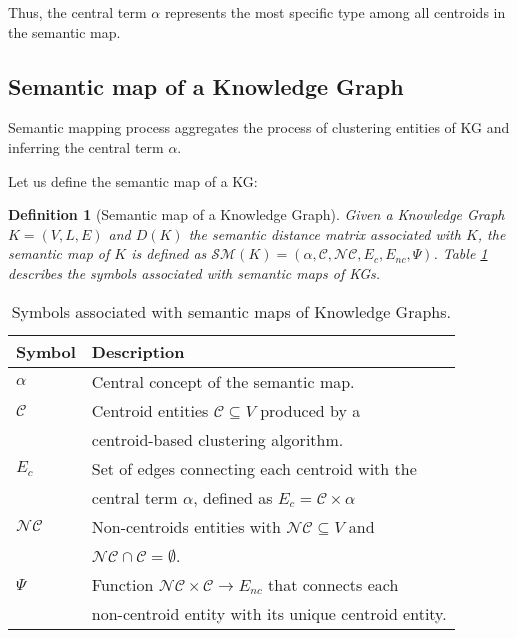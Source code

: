 \documentclass{ieeeaccess}
\newtheorem{Definition}{Definition}
\begin{document}
Thus, the central term $\alpha$ represents the most specific type
among all centroids in the semantic map.

\subsection{Semantic map of a Knowledge Graph}

Semantic mapping process aggregates the process of clustering
entities of KG and inferring the central term $\alpha$. 

Let us define the semantic map of a KG:

\begin{Definition}[Semantic map of a Knowledge Graph]
Given a Knowledge Graph $K = (V, L, E)$ and $D(K)$ the semantic
distance matrix associated with $K$, the semantic map of $K$ is 
defined as $\mathcal{SM}(K) = (\alpha, \mathcal{C}, 
\mathcal{NC}, E_{c}, E_{nc}, \Psi)$. Table \ref{tab:symbols}
describes the symbols associated with semantic maps of KGs.
\end{Definition}

\begin{table}[!htb]
\caption{Symbols associated with semantic maps of Knowledge
Graphs.}
\label{tab:symbols}
\centering
\begin{tabular}{ll}
     \toprule
     \textbf{Symbol} & 
     \textbf{Description} 
     \\
     \midrule
     $\alpha$ & Central concept of the semantic map. \\
     $\mathcal{C}$ & Centroid entities $\mathcal{C} \subseteq V$ produced by a \\
     & centroid-based clustering algorithm. \\
     $E_{c}$ & Set of edges connecting each centroid with the \\
     & central term $\alpha$, 
    defined as $E_{c} =  \mathcal{C} \times \alpha$ \\
    $\mathcal{NC}$ & Non-centroids entities with $\mathcal{NC} \subseteq V$ and \\
    & 
    $\mathcal{NC} \cap \mathcal{C} = \emptyset $. \\
    $\Psi$ & Function $\mathcal{NC} \times \mathcal{C} \rightarrow E_{nc}$ that 
    connects each \\
    & non-centroid entity with its unique centroid entity. \\ 
     \bottomrule
\end{tabular}
\end{table}
\end{document}
